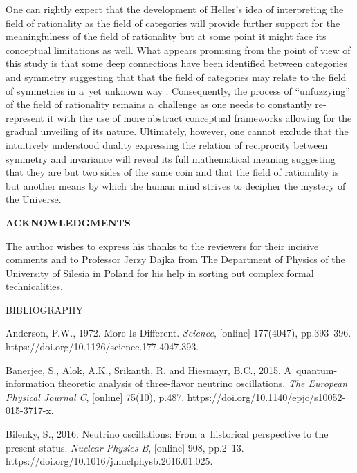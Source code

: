 One can rightly expect that the development of Heller's idea of interpreting the field of rationality as the field of categories will provide further support for the meaningfulness of the field of rationality but at some point it might face its conceptual limitations as well. What appears promising from the point of view of this study is that some deep connections have been identified between categories and symmetry suggesting that that the field of categories may relate to the field of symmetries in a~yet unknown way 
\parencite[e.g][]{heunen_principle_2008}. %
 Consequently, the process of ``unfuzzying'' of the field of rationality remains a~challenge as one needs to constantly re-represent it with the use of more abstract conceptual frameworks allowing for the gradual unveiling of its nature. Ultimately, however, one cannot exclude that the intuitively understood duality expressing the relation of reciprocity between symmetry and invariance will reveal its full mathematical meaning suggesting that they are but two sides of the same coin and that the field of rationality is but another means by which the human mind strives to decipher the mystery of the Universe.



\textbf{ACKNOWLEDGMENTS}



The author wishes to express his thanks to the reviewers for their incisive comments and to Professor Jerzy Dajka from The Department of Physics of the University of Silesia in Poland for his help in sorting out complex formal technicalities.



BIBLIOGRAPHY



Anderson, P.W., 1972. More Is Different. \textit{Science}, [online] 177(4047), pp.393–396. https://doi.org/10.1126/science.177.4047.393.



Banerjee, S., Alok, A.K., Srikanth, R. and Hiesmayr, B.C., 2015. A~quantum-information theoretic analysis of three-flavor neutrino oscillations. \textit{The European Physical Journal C}, [online] 75(10), p.487. https://doi.org/10.1140/epjc/s10052-015-3717-x.



Bilenky, S., 2016. Neutrino oscillations: From a~historical perspective to the present status. \textit{Nuclear Physics B}, [online] 908, pp.2–13. https://doi.org/10.1016/j.nuclphysb.2016.01.025.



